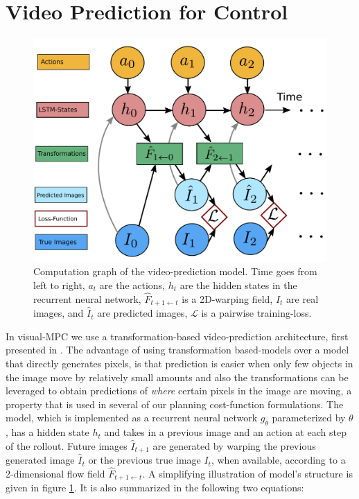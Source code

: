 \section{Video Prediction for Control}
\label{sec:model}

\begin{figure}[t]
	\centering
	\includegraphics[width=1.0\columnwidth]{images_general/prediction_model.pdf}
	\caption{\small{Computation graph of the video-prediction model. Time goes from left to right, $a_t$ are the actions, $h_t$ are the hidden states in the recurrent neural network, $\hat{F}_{t+1 \leftarrow t}$ is a 2D-warping field, $I_t$ are real images, and $\hat{I}_t$ are predicted images, $\mathcal{L}$ is a pairwise training-loss.}}   
	\label{fig:prediction_model}
\end{figure}

In visual-MPC we use a transformation-based video-prediction architecture, first presented in \cite{finn_nips}. The advantage of using transformation based-models over a model that directly generates pixels, is that prediction is easier when only few objects in the image move by relatively small amounts and also the transformations can be leveraged to obtain predictions of \emph{where} certain pixels in the image are moving, a property that is used in several of our planning cost-function formulations. The model, which is implemented as a recurrent neural network $g_{\theta}$ parameterized by $\theta$, has a hidden state $h_t$ and takes in a previous image and an action at each step of the rollout. Future images $\hat{I}_{t+1}$ are generated by warping the previous generated image $\hat{I}_t$ or the previous true image $I_t$, when available, according to a 2-dimensional flow field $\hat{F}_{t+1 \leftarrow t}$. A simplifying illustration of model's structure is given in figure \ref{fig:prediction_model}. It is also summarized in the following two equations:

